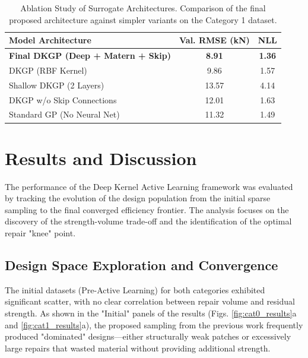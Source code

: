 \documentclass[
  preprint,
  12pt,
  a4paper
]{elsarticle}
\begin{document}
\begin{table}[htbp]
    \centering
    \caption{Ablation Study of Surrogate Architectures. Comparison of the final proposed architecture against simpler variants on the Category 1 dataset.}
    \label{tab:ablation}
    \begin{tabular}{l c c}
        \toprule
        \textbf{Model Architecture} & \textbf{Val. RMSE (kN)} & \textbf{NLL} \\
        \midrule
        \textbf{Final DKGP (Deep + Matern + Skip)} & \textbf{8.91} & \textbf{1.36} \\
        DKGP (RBF Kernel) & 9.86 & 1.57 \\
        Shallow DKGP (2 Layers) & 13.57 & 4.14 \\
        DKGP w/o Skip Connections & 12.01 & 1.63 \\
        Standard GP (No Neural Net) & 11.32 & 1.49 \\
        \bottomrule
    \end{tabular}
\end{table}

\section{Results and Discussion}
\label{sec:results}

The performance of the Deep Kernel Active Learning framework was evaluated by tracking the evolution of the design population from the initial sparse sampling to the final converged efficiency frontier. The analysis focuses on the discovery of the strength-volume trade-off and the identification of the optimal repair "knee" point.

\subsection{Design Space Exploration and Convergence}
The initial datasets (Pre-Active Learning) for both categories exhibited significant scatter, with no clear correlation between repair volume and residual strength. As shown in the "Initial" panels of the results (Figs. \ref{fig:cat0_results}a and \ref{fig:cat1_results}a), the proposed sampling from the previous work frequently produced "dominated" designs—either structurally weak patches or excessively large repairs that wasted material without providing additional strength.
\end{document}
